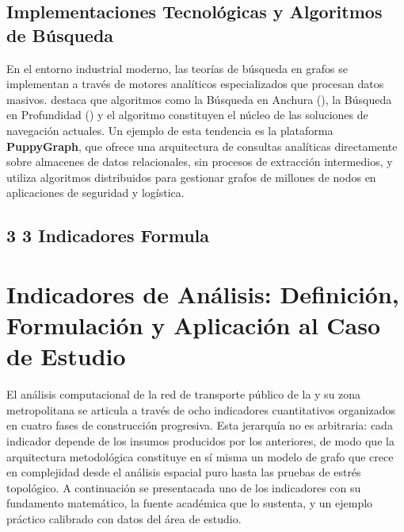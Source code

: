 \subsection{Implementaciones Tecnológicas y Algoritmos de Búsqueda}
\label{subsec:implementaciones-grafos}
    En el entorno industrial moderno, las teorías de búsqueda en grafos se implementan a través de motores
    analíticos especializados que procesan datos masivos. \textcite{wang2025} destaca que algoritmos como la
    Búsqueda en Anchura (), la Búsqueda en Profundidad () y el algoritmo 
    constituyen el núcleo de las soluciones de navegación actuales. Un ejemplo de esta tendencia es la plataforma
    \textbf{PuppyGraph}, que ofrece una arquitectura de consultas analíticas directamente sobre almacenes de datos
    relacionales, sin procesos de extracción intermedios, y utiliza algoritmos distribuidos para gestionar grafos
    de millones de nodos en aplicaciones de seguridad y logística.

\subsection*{3 3 Indicadores Formula}


\section{Indicadores de Análisis: Definición, Formulación y Aplicación al
         Caso de Estudio}
\label{sec:indicadores-formulas}

El análisis computacional de la red de transporte público de la \cdmx{} y su zona
metropolitana se articula a través de ocho indicadores cuantitativos organizados en
cuatro fases de construcción progresiva. Esta jerarquía no es arbitraria: cada
indicador depende de los insumos producidos por los anteriores, de modo que la
arquitectura metodológica constituye en sí misma un modelo de grafo que crece en
complejidad desde el análisis espacial puro hasta las pruebas de estrés topológico.
A continuación se presenta\DIFdelbegin {}\DIFdelend  cada uno de los indicadores con su fundamento
matemático, la fuente académica que lo sustenta, y un ejemplo práctico calibrado
con datos del área de estudio.


